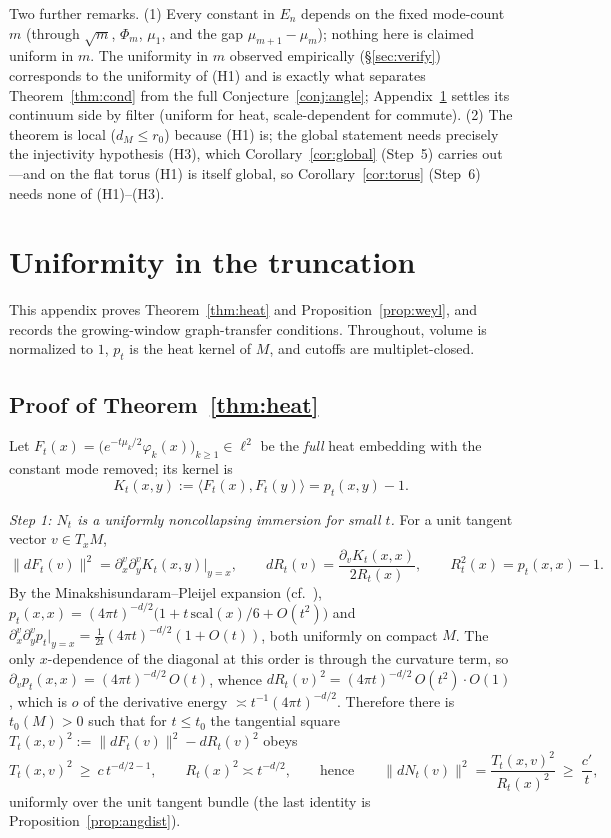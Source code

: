 \documentclass[review,supplement]{siamart220329}
\begin{document}
Two further remarks. (1) Every constant in $E_n$ depends on the fixed
mode-count $m$ (through $\sqrt m$, $\Phi_m$, $\mu_1$, and the gap
$\mu_{m+1}-\mu_m$); nothing here is claimed uniform in $m$. The uniformity in
$m$ observed empirically (\S\ref{sec:verify}) corresponds to the
uniformity of (H1) \cite{bates2014,portegies2016} and is exactly what separates
Theorem~\ref{thm:cond} from the full Conjecture~\ref{conj:angle};
Appendix~\ref{app:uniform} settles its continuum side by filter (uniform for
heat, scale-dependent for commute). (2) The
theorem is local ($d_M\le r_0$) because (H1) is; the global statement needs
precisely the injectivity hypothesis (H3), which Corollary~\ref{cor:global}
(Step~5) carries out---and on the flat torus (H1) is itself global, so
Corollary~\ref{cor:torus} (Step~6) needs none of (H1)--(H3).

\section{Uniformity in the truncation}\label{app:uniform}

This appendix proves Theorem~\ref{thm:heat} and Proposition~\ref{prop:weyl},
and records the growing-window graph-transfer conditions. Throughout, volume
is normalized to $1$, $p_t$ is the heat kernel of $M$, and cutoffs are
multiplet-closed.

\subsection*{Proof of Theorem~\ref{thm:heat}}
Let $F_t(x)=\big(e^{-t\mu_k/2}\varphi_k(x)\big)_{k\ge1}\in\ell^2$ be the
\emph{full} heat embedding with the constant mode removed; its kernel is
\[
K_t(x,y):=\langle F_t(x),F_t(y)\rangle=p_t(x,y)-1 .
\]

\emph{Step 1: $N_t$ is a uniformly noncollapsing immersion for small $t$.}
For a unit tangent vector $v\in T_xM$,
\[
\lVert dF_t(v)\rVert^2=\partial^v_x\partial^v_y K_t(x,y)\big|_{y=x},
\qquad
dR_t(v)=\frac{\partial_v K_t(x,x)}{2R_t(x)},
\qquad R_t^2(x)=p_t(x,x)-1 .
\]
By the Minakshisundaram--Pleijel expansion (cf.\ \cite{berard1994}),
$p_t(x,x)=(4\pi t)^{-d/2}\big(1+t\,\mathrm{scal}(x)/6+O(t^2)\big)$ and
$\partial^v_x\partial^v_y p_t\big|_{y=x}=\tfrac1{2t}(4\pi t)^{-d/2}(1+O(t))$,
both uniformly on compact $M$. The only $x$-dependence of the diagonal at this
order is through the curvature term, so
$\partial_v p_t(x,x)=(4\pi t)^{-d/2}\,O(t)$, whence
$dR_t(v)^2=(4\pi t)^{-d/2}\,O(t^{2})\cdot O(1)$, which is $o$ of the
derivative energy $\asymp t^{-1}(4\pi t)^{-d/2}$. Therefore there is
$t_0(M)>0$ such that for $t\le t_0$ the tangential square
$T_t(x,v)^2:=\lVert dF_t(v)\rVert^2-dR_t(v)^2$ obeys
\[
T_t(x,v)^2\ \ge\ c\,t^{-d/2-1},\qquad
R_t(x)^2\asymp t^{-d/2},\qquad\text{hence}\qquad
\lVert dN_t(v)\rVert^2=\frac{T_t(x,v)^2}{R_t(x)^2}\ \ge\ \frac{c'}{t},
\]
uniformly over the unit tangent bundle (the last identity is
Proposition~\ref{prop:angdist}).
\end{document}
